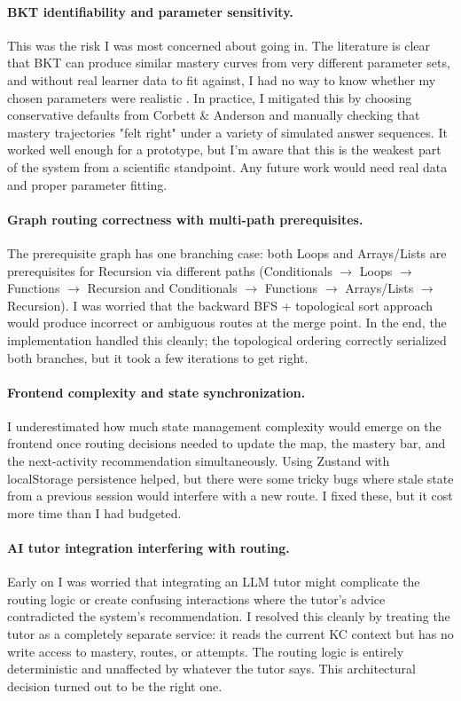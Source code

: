\documentclass{article}
\begin{document}
\paragraph{BKT identifiability and parameter sensitivity.}
This was the risk I was most concerned about going in. The literature is clear that BKT can produce similar mastery curves from very different parameter sets, and without real learner data to fit against, I had no way to know whether my chosen parameters were realistic \cite{vandesande2013}. In practice, I mitigated this by choosing conservative defaults from Corbett \& Anderson \cite{corbett1995} and manually checking that mastery trajectories "felt right" under a variety of simulated answer sequences. It worked well enough for a prototype, but I'm aware that this is the weakest part of the system from a scientific standpoint. Any future work would need real data and proper parameter fitting.

\paragraph{Graph routing correctness with multi-path prerequisites.}
The prerequisite graph has one branching case: both Loops and Arrays/Lists are prerequisites for Recursion via different paths (Conditionals $\to$ Loops $\to$ Functions $\to$ Recursion and Conditionals $\to$ Functions $\to$ Arrays/Lists $\to$ Recursion). I was worried that the backward BFS + topological sort approach would produce incorrect or ambiguous routes at the merge point. In the end, the implementation handled this cleanly; the topological ordering correctly serialized both branches, but it took a few iterations to get right.

\paragraph{Frontend complexity and state synchronization.}
I underestimated how much state management complexity would emerge on the frontend once routing decisions needed to update the map, the mastery bar, and the next-activity recommendation simultaneously. Using Zustand with localStorage persistence helped, but there were some tricky bugs where stale state from a previous session would interfere with a new route. I fixed these, but it cost more time than I had budgeted.

\paragraph{AI tutor integration interfering with routing.}
Early on I was worried that integrating an LLM tutor might complicate the routing logic or create confusing interactions where the tutor's advice contradicted the system's recommendation. I resolved this cleanly by treating the tutor as a completely separate service: it reads the current KC context but has no write access to mastery, routes, or attempts. The routing logic is entirely deterministic and unaffected by whatever the tutor says. This architectural decision turned out to be the right one.
\end{document}
